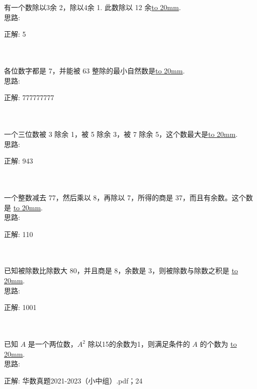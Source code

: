 \item {
    有一个数除以3余 2，除以4余 1. 此数除以 12 余\underline{\hbox to 20mm{}}.
    \ifshowSolution
        \fangsong{}
        \\
        思路:

        正解: 5
    \else
        \\ \\ \\
    \fi
}

\item {
    各位数字都是 7，并能被 63 整除的最小自然数是\underline{\hbox to 20mm{}}.
    \ifshowSolution
        \fangsong{}
        \\
        思路:

        正解: 777777777
    \else
        \\ \\ \\
    \fi
}

\item {
    一个三位数被 3 除余 1，被 5 除余 3，被 7 除余 5，这个数最大是\underline{\hbox to 20mm{}}.
    \ifshowSolution
        \fangsong{}
        \\
        思路:

        正解: 943
    \else
        \\ \\ \\
    \fi
}

\item {
    一个整数减去 77，然后乘以 8，再除以 7，所得的商是 37，而且有余数。这个数是 \underline{\hbox to 20mm{}}.
    \ifshowSolution
        \fangsong{}
        \\
        思路:

        正解: 110
    \else
        \\ \\ \\
    \fi
}

\item {
    已知被除数比除数大 80，并且商是 8，余数是 3，则被除数与除数之积是 \underline{\hbox to 20mm{}}.
    \ifshowSolution
        \fangsong{}
        \\
        思路:

        正解: 1001
    \else
        \\ \\ \\
    \fi
}

\item {
    已知 $A$ 是一个两位数，$A^2$ 除以15的余数为1，则满足条件的 $A$ 的个数为 \underline{\hbox to 20mm{}}.
    \ifshowSolution
        \fangsong{}
        \\
        思路:

        正解: 华数真题2021-2023（小中组）.pdf；24
    \else
        \\ \\ \\
    \fi
}
